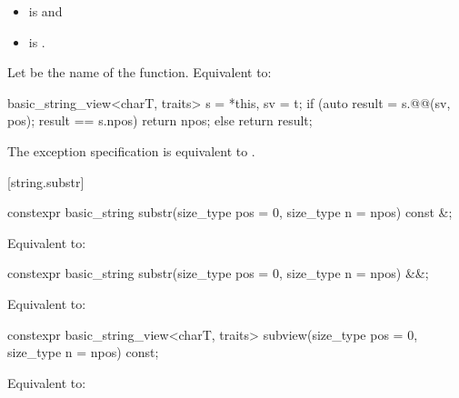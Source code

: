 \begin{itemdescr}
\pnum
\constraints
\begin{itemize}
\item
{} is
 and
\item
{} is
.
\end{itemize}

\pnum
\effects
Let  be the name of the function.
Equivalent to:
\begin{codeblock}
basic_string_view<charT, traits> s = *this, sv = t;
if (auto result = s.@@(sv, pos); result == s.npos) {
  return npos;
} else {
  return result;
}
\end{codeblock}

\pnum
\remarks
The exception specification is equivalent to
.
\end{itemdescr}

[string.substr]{}

%
\begin{itemdecl}
constexpr basic_string substr(size_type pos = 0, size_type n = npos) const &;
\end{itemdecl}

\begin{itemdescr}
\pnum
\effects
Equivalent to: 
\end{itemdescr}

%
\begin{itemdecl}
constexpr basic_string substr(size_type pos = 0, size_type n = npos) &&;
\end{itemdecl}

\begin{itemdescr}
\pnum
\effects
Equivalent to: 
\end{itemdescr}

%
\begin{itemdecl}
constexpr basic_string_view<charT, traits> subview(size_type pos = 0, size_type n = npos) const;
\end{itemdecl}

\begin{itemdescr}
\pnum
\effects
Equivalent to: 
\end{itemdescr}

